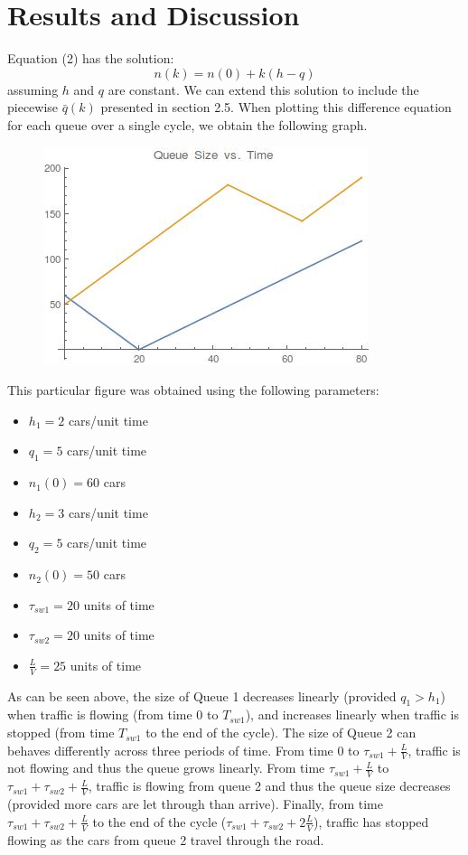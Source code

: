 \documentclass[a4paper]{article}
\begin{document}
\section{Results and Discussion}
Equation (2) has the solution:
\begin{equation}
n(k)=n(0)+k(h-q)
\end{equation}
assuming $h$ and $q$ are constant. We can extend this solution to include the piecewise $\bar{q}(k)$ presented in section 2.5. When plotting this difference equation for each queue over a single cycle, we obtain the following graph.
\begin{figure}[h]
\centering
\includegraphics[scale=0.5]{QueueSizeGrowth.jpg}
\end{figure}
This particular figure was obtained using the following parameters:
\begin{itemize}
\item $h_{1}=2$ cars/unit time
\item $q_{1}=5$ cars/unit time 
\item $n_{1}(0)=60$ cars
\item $h_{2}=3$ cars/unit time
\item $q_{2}=5$ cars/unit time
\item $n_{2}(0)=50$ cars
\item $\tau_{sw1}=20$ units of time
\item $\tau_{sw2}=20$ units of time
\item $\frac{L}{V}=25$ units of time
\end{itemize}
As can be seen above, the size of Queue 1 decreases linearly (provided $q_{1} > h_{1}$) when traffic is flowing (from time 0 to $T_{sw1}$), and increases linearly when traffic is stopped (from time $T_{sw1}$ to the end of the cycle). The size of Queue 2 can behaves differently across three periods of time. From time 0 to $\tau_{sw1}+\frac{L}{V}$, traffic is not flowing and thus the queue grows linearly. From time $\tau_{sw1}+\frac{L}{V}$ to $\tau_{sw1}+\tau_{sw2}+\frac{L}{V}$, traffic is flowing from queue 2 and thus the queue size decreases (provided more cars are let through than arrive). Finally, from time $\tau_{sw1}+\tau_{sw2}+\frac{L}{V}$ to the end of the cycle ($\tau_{sw1}+\tau_{sw2}+2\frac{L}{V}$), traffic has stopped flowing as the cars from queue 2 travel through the road.
\end{document}
